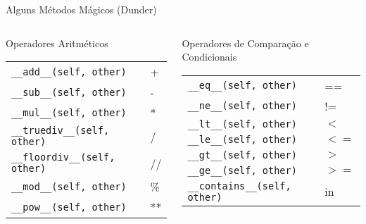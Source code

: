 \begin{frame}{Alguns Métodos Mágicos (Dunder)}

    \begin{columns}[T] %

        \begin{column}{0.48\textwidth}
            \begin{block}{Operadores Aritméticos}
                \begin{tabular}{ll}
                    \texttt{\_\_add\_\_(self, other)}      & +  \\
                    \texttt{\_\_sub\_\_(self, other)}      & -  \\
                    \texttt{\_\_mul\_\_(self, other)}      & *  \\
                    \texttt{\_\_truediv\_\_(self, other)}  & /  \\
                    \texttt{\_\_floordiv\_\_(self, other)} & // \\
                    \texttt{\_\_mod\_\_(self, other)}      & \% \\
                    \texttt{\_\_pow\_\_(self, other)}      & **
                \end{tabular}
            \end{block}
        \end{column}

        \begin{column}{0.48\textwidth}
            \begin{block}{Operadores de Comparação e Condicionais}
                \begin{tabular}{ll}
                    \texttt{\_\_eq\_\_(self, other)}       & ==   \\
                    \texttt{\_\_ne\_\_(self, other)}       & !=   \\
                    \texttt{\_\_lt\_\_(self, other)}       & $<$  \\
                    \texttt{\_\_le\_\_(self, other)}       & $<=$ \\
                    \texttt{\_\_gt\_\_(self, other)}       & $>$  \\
                    \texttt{\_\_ge\_\_(self, other)}       & $>=$ \\
                    \texttt{\_\_contains\_\_(self, other)} & in
                \end{tabular}
            \end{block}
        \end{column}

    \end{columns}

\end{frame}



